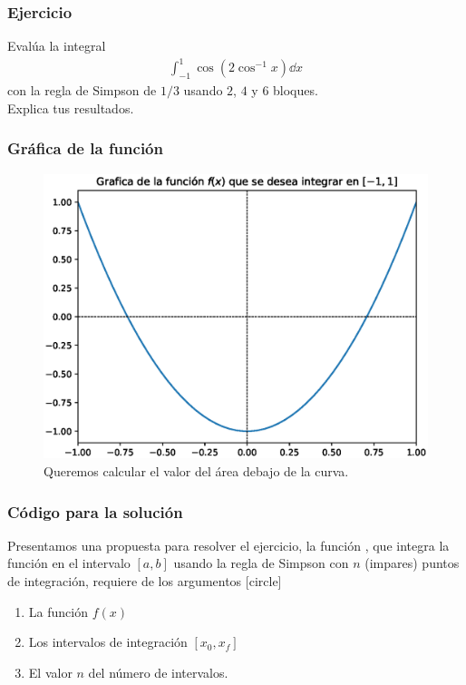 \begin{frame}
\frametitle{Ejercicio}
Evalúa la integral
\begin{align*}
\int_{-1}^{1} \cos(2 \cos^{-1} x) \dd{x}
\end{align*}
con la regla de Simpson de $1/3$ usando $2$, $4$ y $6$ bloques.
\\
\bigskip
Explica tus resultados.
\end{frame}
\begin{frame}
\frametitle{Gráfica de la función}
\begin{figure}
    \centering
    \includegraphics[scale=0.5]{Imagenes/integral_1_3_simpson.eps}
    \caption{Queremos calcular el valor del área debajo de la curva.}
\end{figure}
\end{frame}
\begin{frame}
\frametitle{Código para la solución}
Presentamos una propuesta para resolver el ejercicio, la función , que integra la función  en el intervalo $[a, b]$ usando la regla de Simpson con $n$ (impares) puntos de integración, requiere de los argumentos
[circle]
\begin{enumerate}[<+->]
\item La función $f(x)$
\item Los intervalos de integración $[x_{0}, x_{f}]$
\item El valor $n$ del número de intervalos.
\end{enumerate}
\end{frame}
